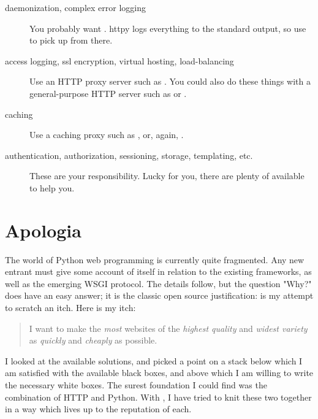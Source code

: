 \begin{description}

\item[daemonization, complex error logging]
    {You probably want . httpy logs everything to the
    standard output, so use
     to pick up from
    there.}

\item[access logging, ssl encryption, virtual hosting, load-balancing]
    {Use an HTTP proxy server such as .
    You could also do these things with a general-purpose HTTP server such as
     or
    .}

\item[caching]
    {Use a caching proxy such as , or,
    again, .}

\item[authentication, authorization, sessioning, storage, templating, etc.]
    {These are your responsibility. Lucky for you, there are plenty of
     available to help
    you.}

\end{description}



\section{Apologia \label{apologia}}

The world of Python web programming is currently quite fragmented. Any new
entrant must give some account of itself in relation to the existing frameworks,
as well as the emerging WSGI protocol. The details follow, but the question
"Why?" does have an easy answer; it is the classic open source justification:
 is my attempt to scratch an itch. Here is my itch:

\begin{quote} I want to make the \emph{most} websites of the \emph{highest
quality} and \emph{widest variety} as \emph{quickly} and \emph{cheaply} as
possible. \end{quote}

I looked at the available solutions, and picked a point on a stack below which I
am satisfied with the available black boxes, and above which I am willing to
write the necessary white boxes. The surest foundation I could find was the
combination of HTTP and Python. With , I have tried to knit these
two together in a way which lives up to the reputation of each.


